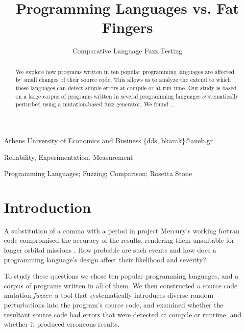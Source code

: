 \documentclass[10pt]{sigplanconf}
\begin{document}
\copyrightdata{[to be supplied]}


\title{Programming Languages vs. Fat Fingers}
\subtitle{Comparative Language Fuzz Testing}

  {Athens University of Economics and Business}
  {\{dds, bkarak\}@aueb.gr}

\maketitle

\begin{abstract}
We explore how programs written in ten popular programming languages
are affected by small changes of their source code.
This allows us to analyze the extend to which these languages
can detect simple errors at compile or at run time.
Our study is based on a large corpus of programs written in several programming
languages systematically perturbed using a mutation-based fuzz generator.
We found ... %
\end{abstract}
 

\terms
Reliability, Experimentation, Measurement

\keywords
Programming Languages; Fuzzing; Comparison; Rosetta Stone

\section{Introduction} %
A substitution of a comma with a period in project Mercury's working
{\sc fortran} code compromised the accuracy of the results,
rendering them unsuitable for longer orbital missions \cite{Brad89,Neu95}.
How probable are such events and how does a programming language's
design affect their likelihood and severity?

To study these questions we chose ten popular programming languages,
and a corpus of programs written in all of them.
We then constructed a source code mutation {\em fuzzer}:
a tool that systematically introduces diverse random perturbations
into the program's source code,
and examined whether the resultant source code had errors that
were detected at compile or runtime, and whether it produced
erroneous results.
\end{document}
